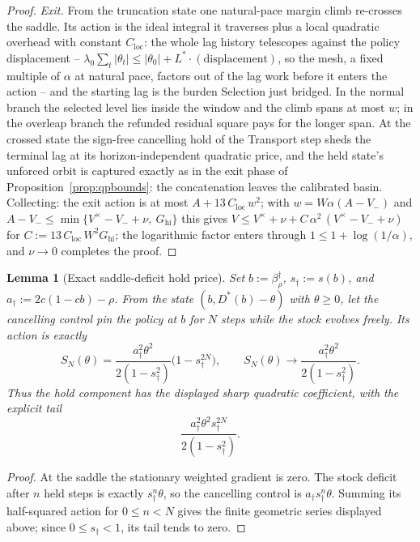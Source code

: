 \documentclass[11pt]{article}
\newtheorem{lemma}[theorem]{Lemma}
\theoremstyle{definition}
\theoremstyle{remark}
\numberwithin{equation}{section}
\begin{document}
\begin{proof}
\emph{Exit.} From the truncation state one natural-pace margin climb re-crosses the saddle. Its action is the ideal integral it traverses plus a local quadratic overhead with constant $C_{\mathrm{loc}}$: the whole lag history telescopes against the policy displacement -- $\lambda_0\sum_t|\theta_t| \le |\theta_0| + L^\ast\cdot(\text{displacement})$, so the mesh, a fixed multiple of $\alpha$ at natural pace, factors out of the lag work before it enters the action -- and the starting lag is the burden Selection just bridged. In the normal branch the selected level lies inside the window and the climb spans at most $w$; in the overleap branch the refunded residual square pays for the longer span. At the crossed state the sign-free cancelling hold of the Transport step sheds the terminal lag at its horizon-independent quadratic price, and the held state's unforced orbit is captured exactly as in the exit phase of Proposition~\ref{prop:qpbounds}: the concatenation leaves the calibrated basin. Collecting: the exit action is at most $A + 13\,C_{\mathrm{loc}}\,w^2$; with $w = W\alpha(A - V_-)$ and $A - V_- \le \min\{V^{\times} - V_- + \nu,\ G_{\mathrm{hi}}\}$ this gives $V \le V^{\times} + \nu + C\,\alpha^2\,(V^{\times} - V_- + \nu)$ for $C := 13\,C_{\mathrm{loc}}\,W^2 G_{\mathrm{hi}}$; the logarithmic factor enters through $1 \le 1 + \log(1/\alpha)$, and $\nu \to 0$ completes the proof.
\end{proof}

\begin{lemma}[Exact saddle-deficit hold price]\label{lem:saddlehold}
Set $b:=\beta^\dagger_\rho$, $s_\dagger:=s(b)$, and
$a_\dagger:=2c(1-cb)-\rho$. From the state
$(b,D^\ast(b)-\theta)$ with $\theta\ge0$, let the cancelling control pin the
policy at $b$ for $N$ steps while the stock evolves freely. Its action is
exactly
\[
S_N(\theta)
=
\frac{a_\dagger^2\theta^2}{2(1-s_\dagger^2)}
\bigl(1-s_\dagger^{2N}\bigr),
\qquad
S_N(\theta)\longrightarrow
\frac{a_\dagger^2\theta^2}{2(1-s_\dagger^2)}.
\]
Thus the hold component has the displayed sharp quadratic coefficient, with
the explicit tail
\[
\frac{a_\dagger^2\theta^2s_\dagger^{2N}}{2(1-s_\dagger^2)}.
\]
\end{lemma}
\begin{proof}
At the saddle the stationary weighted gradient is zero. The stock deficit
after $n$ held steps is exactly $s_\dagger^n\theta$, so the cancelling control
is $a_\dagger s_\dagger^n\theta$. Summing its half-squared action for
$0\le n<N$ gives the finite geometric series displayed above; since
$0\le s_\dagger<1$, its tail tends to zero.
\end{proof}
\end{document}
